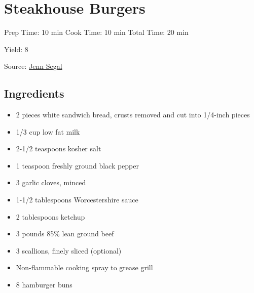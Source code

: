 \section{Steakhouse Burgers}

\begin{center}
Prep Time: 10 min
Cook Time: 10 min
Total Time: 20 min

\noindent Yield: 8

\vspace{1em}

    Source: \href{https://www.onceuponachef.com/recipes/steakhouse-burgers.html}{Jenn Segal}
\end{center}

\subsection{Ingredients}
\begin{multicols}{2}
\begin{itemize}
    \item 2 pieces white sandwich bread, crusts removed and cut into 1/4-inch pieces
    \item 1/3 cup low fat milk
    \item 2-1/2 teaspoons kosher salt
    \item 1 teaspoon freshly ground black pepper
    \item 3 garlic cloves, minced
    \item 1-1/2 tablespoons Worcestershire sauce
    \item 2 tablespoons ketchup
    \item 3 pounds 85\% lean ground beef
    \item 3 scallions, finely sliced (optional)
    \item Non-flammable cooking spray to grease grill
    \item 8 hamburger buns
\end{itemize}
\end{multicols}

